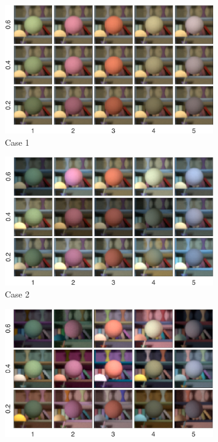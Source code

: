\documentclass{jov}
\begin{document}
\begin{figure}
\centering
	\begin{subfigure}[b]{0.33 \textwidth}
		\includegraphics[width=\textwidth]{../Figures/Figure2/Figure2_a.jpeg}
		\caption{Case 1}
 		\label{fig:targetVarying}
	\end{subfigure}
	\begin{subfigure}[b]{0.33 \textwidth}
        \includegraphics[width=\textwidth]{../Figures/Figure2/Figure2_b.jpeg}
        \caption{Case 2}
        \label{fig:targetIlluminantVarying}
    \end{subfigure}
	\begin{subfigure}[b]{0.33 \textwidth}
        \includegraphics[width=\textwidth]{../Figures/Figure2/Figure2_c.jpeg}

\end{subfigure}
\end{figure}
\end{document}
